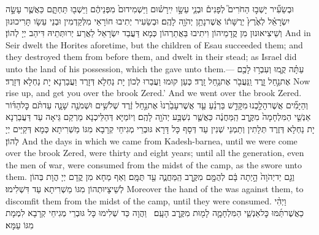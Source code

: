 {וּבְשֵׂעִ֞יר יָשְׁב֣וּ הַחֹרִים֮ לְפָנִים֒ וּבְנֵ֧י עֵשָׂ֣ו יִֽירָשׁ֗וּם וַיַּשְׁמִידוּם֙ מִפְּנֵיהֶ֔ם וַיֵּשְׁב֖וּ תַּחְתָּ֑ם כַּאֲשֶׁ֧ר עָשָׂ֣ה יִשְׂרָאֵ֗ל לְאֶ֙רֶץ֙ יְרֻשָּׁת֔וֹ אֲשֶׁר\maqqaf נָתַ֥ן יְהֹוָ֖ה לָהֶֽם׃}
{וּבְשֵׂעִיר יְתִיבוּ חוֹרָאֵי מִלְּקַדְמִין וּבְנֵי עֵשָׂו תָּרִיכוּנוּן וְשֵׁיצִיאוּנוּן מִן קֳדָמֵיהוֹן וִיתִיבוּ בַּאֲתַרְהוֹן כְּמָא דַּעֲבַד יִשְׂרָאֵל לַאֲרַע יְרוּתְּתֵיהּ דִּיהַב יְיָ לְהוֹן׃}
{And in Seir dwelt the Horites aforetime, but the children of Esau succeeded them; and they destroyed them from before them, and dwelt in their stead; as Israel did unto the land of his possession, which the \lord\space gave unto them.—}{}
{עַתָּ֗ה קֻ֛מוּ וְעִבְר֥וּ לָכֶ֖ם אֶת\maqqaf נַ֣חַל זָ֑רֶד וַֽנַּעֲבֹ֖ר אֶת\maqqaf נַ֥חַל זָֽרֶד׃}
{כְּעַן קוּמוּ וַעֲבַרוּ לְכוֹן יָת נַחְלָא דְּזָרֶד וַעֲבַרְנָא יָת נַחְלָא דְּזָרֶד׃}
{Now rise up, and get you over the brook Zered.’ And we went over the brook Zered.}{}
{וְהַיָּמִ֞ים אֲשֶׁר\maqqaf הָלַ֣כְנוּ \legarmeh  מִקָּדֵ֣שׁ בַּרְנֵ֗עַ עַ֤ד אֲשֶׁר\maqqaf עָבַ֙רְנוּ֙ אֶת\maqqaf נַ֣חַל זֶ֔רֶד שְׁלֹשִׁ֥ים וּשְׁמֹנֶ֖ה שָׁנָ֑ה עַד\maqqaf תֹּ֨ם כׇּל\maqqaf הַדּ֜וֹר אַנְשֵׁ֤י הַמִּלְחָמָה֙ מִקֶּ֣רֶב הַֽמַּחֲנֶ֔ה כַּאֲשֶׁ֛ר נִשְׁבַּ֥ע יְהֹוָ֖ה לָהֶֽם׃}
{וְיוֹמַיָּא דְּהַלֵּיכְנָא מֵרְקַם גֵּיאָה עַד דַּעֲבַרְנָא יָת נַחְלָא דְּזֶרֶד תְּלָתִין וְתַמְנֵי שְׁנִין עַד דְּסָף כָּל דָּרָא גּוּבְרֵי מְגִיחֵי קְרָבָא מִגּוֹ מַשְׁרִיתָא כְּמָא דְּקַיֵּים יְיָ לְהוֹן׃}
{And the days in which we came from Kadesh-barnea, until we were come over the brook Zered, were thirty and eight years; until all the generation, even the men of war, were consumed from the midst of the camp, as the \lord\space swore unto them.}{}
{וְגַ֤ם יַד\maqqaf יְהֹוָה֙ הָ֣יְתָה בָּ֔ם לְהֻמָּ֖ם מִקֶּ֣רֶב הַֽמַּחֲנֶ֑ה עַ֖ד תֻּמָּֽם׃}
{וְאַף מַחָא מִן קֳדָם יְיָ הֲוָת בְּהוֹן לְשֵׁיצָיוּתְהוֹן מִגּוֹ מַשְׁרִיתָא עַד דִּשְׁלִימוּ׃}
{Moreover the hand of the \lord\space was against them, to discomfit them from the midst of the camp, until they were consumed.}{}
{וַיְהִ֨י כַאֲשֶׁר\maqqaf תַּ֜מּוּ כׇּל\maqqaf אַנְשֵׁ֧י הַמִּלְחָמָ֛ה לָמ֖וּת מִקֶּ֥רֶב הָעָֽם׃ \setuma }
{וַהֲוָה כַּד שְׁלִימוּ כָּל גּוּבְרֵי מְגִיחֵי קְרָבָא לִמְמָת מִגּוֹ עַמָּא׃}

